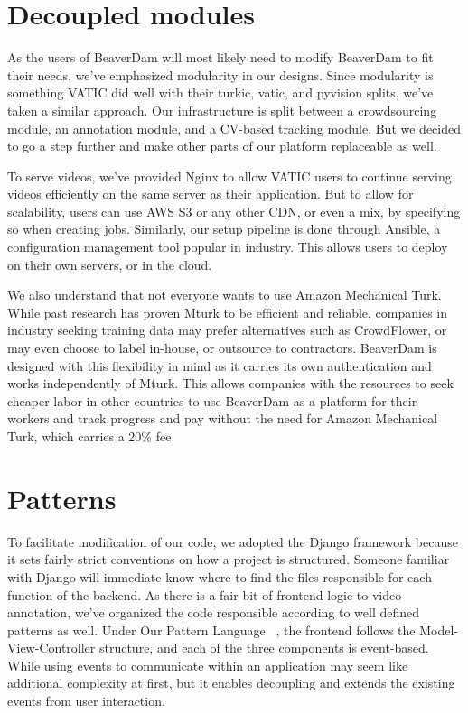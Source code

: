 \section{Decoupled modules}

As the users of BeaverDam will most likely need to modify BeaverDam to fit their needs,
we've emphasized modularity in our designs. 
Since modularity is something VATIC did well with their turkic, vatic, and pyvision splits, 
we've taken a similar approach. 
Our infrastructure is split between a crowdsourcing module, an annotation module, and a CV-based tracking module. 
But we decided to go a step further and make other parts of our platform replaceable as well.

To serve videos, we've provided Nginx to allow VATIC users to continue serving videos efficiently on the same server as their application.
But to allow for scalability, users can use AWS S3 or any other CDN, or even a mix, by specifying so when creating jobs.
Similarly, our setup pipeline is done through Ansible, a configuration management tool popular in industry. 
This allows users to deploy on their own servers, or in the cloud.

We also understand that not everyone wants to use Amazon Mechanical Turk. 
While past research has proven Mturk to be efficient and reliable, 
companies in industry seeking training data may prefer alternatives such as CrowdFlower, 
or may even choose to label in-house, or outsource to contractors.
BeaverDam is designed with this flexibility in mind as it carries its own authentication and works independently of Mturk.
This allows companies with the resources to seek cheaper labor in other countries to use BeaverDam as a platform for their workers
and track progress and pay without the need for Amazon Mechanical Turk, which carries a 20\% fee. 

\section{Patterns}

To facilitate modification of our code, we adopted the Django framework because it sets fairly strict conventions on how a project is structured. 
Someone familiar with Django will immediate know where to find the files responsible for each function of the backend.
As there is a fair bit of frontend logic to video annotation, we've organized the code responsible according to well defined patterns as well. 
Under Our Pattern Language ~\cite{opl}, the frontend follows the Model-View-Controller structure, and each of the three components is event-based. 
While using events to communicate within an application may seem like additional complexity at first, but it enables decoupling and extends the existing events from user interaction.

